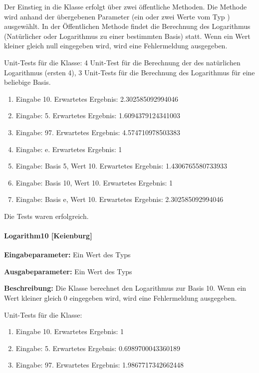 Der Einstieg in die Klasse erfolgt über zwei öffentliche Methoden. Die Methode wird anhand der übergebenen Parameter (ein oder zwei Werte vom Typ ) ausgewählt. In der Öffentlichen Methode findet die Berechnung des Logarithmus (Natürlicher oder Logarithmus zu einer bestimmten Basis) statt. Wenn ein Wert kleiner gleich null eingegeben wird, wird eine Fehlermeldung ausgegeben.

Unit-Tests für die Klasse: 4 Unit-Test für die Berechnung der des natürlichen Logarithmus (ersten 4), 3 Unit-Tests für die Berechnung des Logarithmus für eine beliebige Basis. 

\begin{enumerate}
\item Eingabe 10. Erwartetes Ergebnis: 2.302585092994046
\item Eingabe: 5. Erwartetes Ergebnis: 1.6094379124341003
\item Eingabe: 97. Erwartetes Ergebnis: 4.574710978503383
\item Eingabe: e. Erwartetes Ergebnis: 1
\item Eingabe: Basis 5, Wert 10. Erwartetes Ergebnis: 1.4306765580733933
\item Eingabe: Basis 10, Wert 10. Erwartetes Ergebnis: 1
\item Eingabe: Basis e, Wert 10. Erwartetes Ergebnis: 2.302585092994046
\end{enumerate}

Die Tests waren erfolgreich.

\paragraph{Logarithm10 [Keienburg]}

\textbf{Eingabeparameter:} Ein Wert des Typs 

\textbf{Ausgabeparameter:} Ein Wert des Typs 

\textbf{Beschreibung:} Die Klasse berechnet den Logarithmus zur Basis 10. Wenn ein Wert kleiner gleich 0 eingegeben wird, wird eine Fehlermeldung ausgegeben. 

Unit-Tests für die Klasse: 

\begin{enumerate}
\item Eingabe 10. Erwartetes Ergebnis: 1
\item Eingabe: 5. Erwartetes Ergebnis: 0.6989700043360189
\item Eingabe: 97. Erwartetes Ergebnis: 1.9867717342662448
\end{enumerate}

